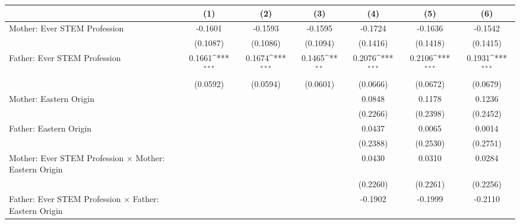 {
\def\sym#1{\ifmmode^{#1}\else\(^{#1}\)\fi}
\begin{tabular}{l*{6}{c}}
\toprule
                    &\multicolumn{1}{c}{(1)}         &\multicolumn{1}{c}{(2)}         &\multicolumn{1}{c}{(3)}         &\multicolumn{1}{c}{(4)}         &\multicolumn{1}{c}{(5)}         &\multicolumn{1}{c}{(6)}         \\
\midrule
Mother: Ever STEM Profession&     -0.1601         &     -0.1593         &     -0.1595         &     -0.1724         &     -0.1636         &     -0.1542         \\
                    &    (0.1087)         &    (0.1086)         &    (0.1094)         &    (0.1416)         &    (0.1418)         &    (0.1415)         \\
\addlinespace
Father: Ever STEM Profession&      0.1661\sym{***}&      0.1674\sym{***}&      0.1465\sym{**} &      0.2076\sym{***}&      0.2106\sym{***}&      0.1931\sym{***}\\
                    &    (0.0592)         &    (0.0594)         &    (0.0601)         &    (0.0666)         &    (0.0672)         &    (0.0679)         \\
\addlinespace
Mother: Eastern Origin&                     &                     &                     &      0.0848         &      0.1178         &      0.1236         \\
                    &                     &                     &                     &    (0.2266)         &    (0.2398)         &    (0.2452)         \\
\addlinespace
Father: Eastern Origin&                     &                     &                     &      0.0437         &      0.0065         &      0.0014         \\
                    &                     &                     &                     &    (0.2388)         &    (0.2530)         &    (0.2751)         \\
\addlinespace
Mother: Ever STEM Profession $\times$ Mother: Eastern Origin&                     &                     &                     &      0.0430         &      0.0310         &      0.0284         \\
                    &                     &                     &                     &    (0.2260)         &    (0.2261)         &    (0.2256)         \\
\addlinespace
Father: Ever STEM Profession $\times$ Father: Eastern Origin&                     &                     &                     &     -0.1902         &     -0.1999         &     -0.2110         \\

\end{tabular}}
